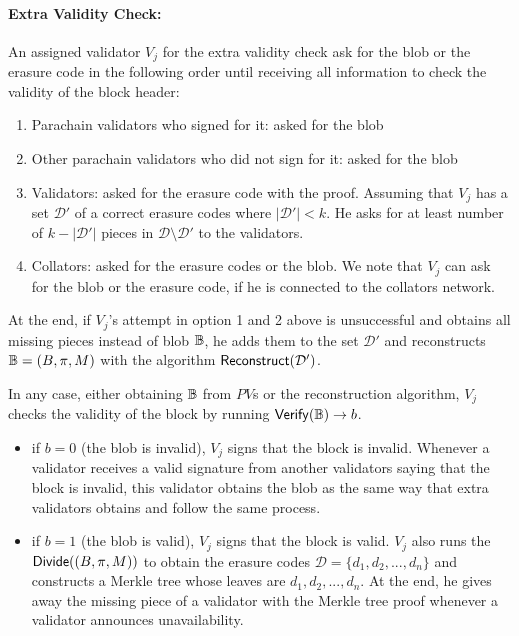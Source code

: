\paragraph{Extra Validity Check:}
An assigned validator $V_j$ for the extra validity check ask for the blob or the erasure code in the following order until receiving all information to check the validity of the block header:
\begin{enumerate}
    \item Parachain validators who signed for it: asked for the blob
    \item Other parachain validators who did not sign for it: asked for the blob
    \item Validators: asked for the erasure code with the proof. Assuming that $V_j$ has a set $\mathcal{D}'$ of a correct erasure codes where $|\mathcal{D}'|<k$. He asks for at least number of $k-|\mathcal{D}'|$ pieces in $\mathcal{D}\setminus \mathcal{D}'$ to the validators.
    
    \item Collators: asked for the erasure codes or the blob. We note that $V_j$ can ask for the blob or the erasure code, if he is connected to the collators network.
    
\end{enumerate}

At the end,  if $V_j$'s attempt in option 1 and 2 above is unsuccessful and  obtains all missing pieces instead of blob $\mathbb{B}$, he adds them to the set $\mathcal{D}'$ and reconstructs  $\mathbb{B} = (B,\pi,M)$ with the algorithm $\mathsf{Reconstruct}(\mathcal{D}')$. 

In any case, either obtaining $\mathbb{B}$ from $PV$s or the reconstruction algorithm, $V_j$ checks the validity of the block by  running  $\mathsf{Verify}(\mathbb{B})\rightarrow b$.
\begin{itemize}
    \item if $b = 0$ (the blob is invalid), $V_j$ signs that the block is invalid. Whenever a validator receives a valid signature from another validators saying that the block is invalid, this validator obtains the blob as the same way that extra validators obtains and follow the same process.
    \item if $b = 1$ (the blob is valid), $V_j$ signs that the block is valid. $V_j$ also  runs the $\mathsf{Divide}((B,\pi,M))$ to obtain the erasure codes $\mathcal{D} = \{d_1,d_2,...,d_n\}$ and constructs a Merkle tree  whose leaves are $d_1,d_2,...,d_n$. At the end, he gives away the missing piece of a validator with the Merkle tree proof whenever a validator announces unavailability. 
\end{itemize}


